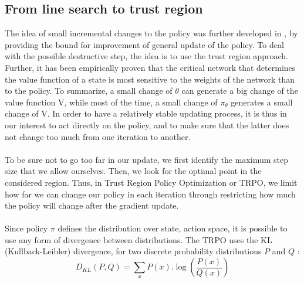 \documentclass{article}
\begin{document}
\subsection{From line search to trust region}
The idea of small incremental changes to the policy was further developed in \cite{schulman2017trust}, by providing the bound for improvement of general update of the policy. To deal with the possible destructive step, the idea is to use the trust region approach. Further, it has been empirically proven that the critical network that determines the value function of a state is most sensitive to the weights of the network than to the policy. To summarize, a small change of $\theta$ can generate a big change of the value function V, while most of the time, a small change of $\pi_{\theta}$ generates a small change of V. In order to have a relatively stable updating process, it is thus in our interest to act directly on the policy, and to make sure that the latter does not change too much from one iteration to another. 
\\ \\ 
To be sure not to go too far in our update, we first identify the maximum step size that we allow ourselves. Then, we look for the optimal point in the considered region. Thus, in Trust Region Policy Optimization or TRPO, we limit how far we can change our policy in each iteration through restricting how much the policy will change after the gradient update. 
\\ \\
Since policy $\pi$ defines the distribution over state, action space, it is possible to use any form of divergence between distributions. The TRPO uses the KL (Kullback-Leibler) divergence, for two discrete probability distributions $P$ and $Q$ :
$$D_{KL}(P,Q) = \sum_{x} P(x) .\log(\frac{P(x)}{Q(x)})$$
\end{document}
